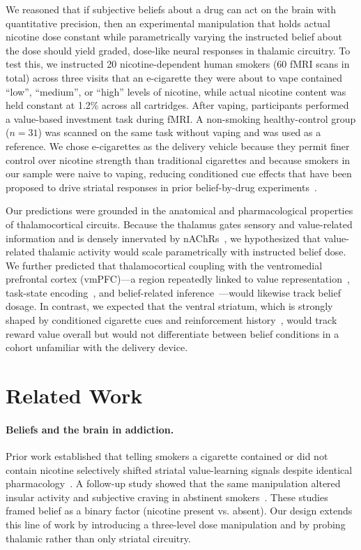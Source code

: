 \documentclass[11pt]{article}
\begin{document}
We reasoned that if subjective beliefs about a drug can act on the brain with quantitative precision, then an experimental manipulation that holds actual nicotine dose constant while parametrically varying the instructed belief about the dose should yield graded, dose-like neural responses in thalamic circuitry. To test this, we instructed 20 nicotine-dependent human smokers (60 fMRI scans in total) across three visits that an e-cigarette they were about to vape contained ``low'', ``medium'', or ``high'' levels of nicotine, while actual nicotine content was held constant at 1.2\% across all cartridges. After vaping, participants performed a value-based investment task during fMRI. A non-smoking healthy-control group ($n=31$) was scanned on the same task without vaping and was used as a reference. We chose e-cigarettes as the delivery vehicle because they permit finer control over nicotine strength than traditional cigarettes and because smokers in our sample were naive to vaping, reducing conditioned cue effects that have been proposed to drive striatal responses in prior belief-by-drug experiments~\cite{gu2015belief}.

Our predictions were grounded in the anatomical and pharmacological properties of thalamocortical circuits. Because the thalamus gates sensory and value-related information and is densely innervated by nAChRs~\cite{sherman2016thalamus,halassa2017thalamic}, we hypothesized that value-related thalamic activity would scale parametrically with instructed belief dose. We further predicted that thalamocortical coupling with the ventromedial prefrontal cortex (vmPFC)---a region repeatedly linked to value representation~\cite{plassmann2007orbitofrontal,levy2012root}, task-state encoding~\cite{wilson2014orbitofrontal,schuck2016human}, and belief-related inference~\cite{rouault2018belief,rouault2022prefrontal}---would likewise track belief dosage. In contrast, we expected that the ventral striatum, which is strongly shaped by conditioned cigarette cues and reinforcement history~\cite{haber2010reward,schultz1997neural,kober2010brain}, would track reward value overall but would not differentiate between belief conditions in a cohort unfamiliar with the delivery device.

\section{Related Work}

\paragraph{Beliefs and the brain in addiction.} Prior work established that telling smokers a cigarette contained or did not contain nicotine selectively shifted striatal value-learning signals despite identical pharmacology~\cite{gu2015belief}. A follow-up study showed that the same manipulation altered insular activity and subjective craving in abstinent smokers~\cite{gu2016belief}. These studies framed belief as a binary factor (nicotine present vs. absent). Our design extends this line of work by introducing a three-level dose manipulation and by probing thalamic rather than only striatal circuitry.
\end{document}

